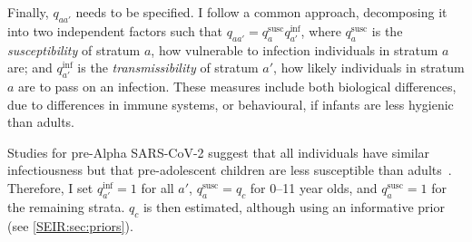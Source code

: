 \documentclass[thesis.tex]{subfiles}
\begin{document}

Finally, $q_{aa'}$ needs to be specified.
I follow a common approach, decomposing it into two independent factors such that $q_{aa'} = q^\text{susc}_{a} q^\text{inf}_{a'}$, where $q^\text{susc}_a$ is the \emph{susceptibility} of stratum $a$, \ie how vulnerable to infection individuals in stratum $a$ are; and $q^\text{inf}_{a'}$ is the \emph{transmissibility} of stratum $a'$, \ie how likely individuals in stratum $a$ are to pass on an infection.
These measures include both biological differences, \eg due to differences in immune systems, or behavioural, \eg if infants are less hygienic than adults.


Studies for pre-Alpha SARS-CoV-2 suggest that all individuals have similar infectiousness but that pre-adolescent children are less susceptible than adults~\autocites{chenRole}{vinerTransmission}.
Therefore, I set $q^\text{inf}_{a'} = 1$ for all $a'$, $q^\text{susc}_{a} = q_c$ for 0--11 year olds, and $q^\text{susc}_{a} = 1$ for the remaining strata.
$q_c$ is then estimated, although using an informative prior (see \cref{SEIR:sec:priors}).
\end{document}
